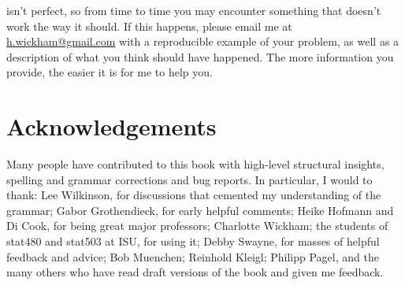 \ggplot isn't perfect, so from time to time you may encounter something that doesn't work the way it should.  If this happens, please email me at \href{mailto:h.wickham@gmail.com}{h.wickham@gmail.com} with a reproducible example of your problem, as well as a description of what you think should have happened.  The more information you provide, the easier it is for me to help you.

\section{Acknowledgements}\label{sec:acknolwedgements}

Many people have contributed to this book with high-level structural insights, spelling and grammar corrections and bug reports.  In particular, I would to thank: Lee Wilkinson, for discussions that cemented my understanding of the grammar; Gabor Grothendieck, for early helpful comments; Heike Hofmann and Di Cook, for being great major professors; Charlotte Wickham; the students of stat480 and stat503 at ISU, for using it; Debby Swayne, for masses of helpful feedback and advice; Bob Muenchen; Reinhold Kleigl; Philipp Pagel, and the many others who have read draft versions of the book and given me feedback.


